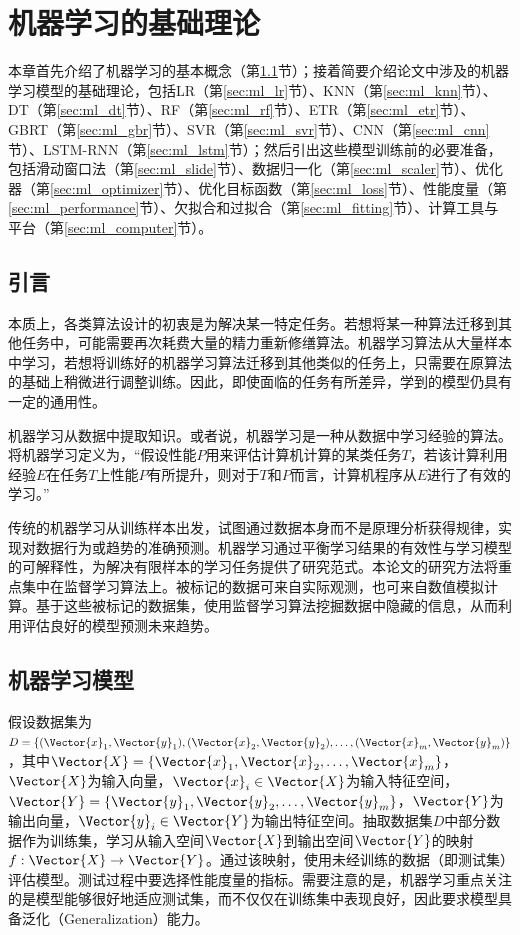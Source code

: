 \chapter{机器学习的基础理论}\label{chap:ml_theory}

本章首先介绍了机器学习的基本概念（第\ref{sec:ml_intro}节）；接着简要介绍论文中涉及的机器学习模型的基础理论，包括LR（第\ref{sec:ml_lr}节）、KNN（第\ref{sec:ml_knn}节）、DT（第\ref{sec:ml_dt}节）、RF（第\ref{sec:ml_rf}节）、ETR（第\ref{sec:ml_etr}节）、GBRT（第\ref{sec:ml_gbr}节）、SVR（第\ref{sec:ml_svr}节）、CNN（第\ref{sec:ml_cnn}节）、LSTM-RNN（第\ref{sec:ml_lstm}节）；然后引出这些模型训练前的必要准备，包括滑动窗口法（第\ref{sec:ml_slide}节）、数据归一化（第\ref{sec:ml_scaler}节）、优化器（第\ref{sec:ml_optimizer}节）、优化目标函数（第\ref{sec:ml_loss}节）、性能度量（第\ref{sec:ml_performance}节）、欠拟合和过拟合（第\ref{sec:ml_fitting}节）、计算工具与平台（第\ref{sec:ml_computer}节）。

\section{引言}\label{sec:ml_intro}

本质上，各类算法设计的初衷是为解决某一特定任务。若想将某一种算法迁移到其他任务中，可能需要再次耗费大量的精力重新修缮算法。机器学习算法从大量样本中学习，若想将训练好的机器学习算法迁移到其他类似的任务上，只需要在原算法的基础上稍微进行调整训练。因此，即使面临的任务有所差异，学到的模型仍具有一定的通用性\citep{Goodfellow2016Deep}。

机器学习从数据中提取知识。或者说，机器学习是一种从数据中学习经验的算法。\citet{Mitchell1997Machine}将机器学习定义为，“假设性能$P$用来评估计算机计算的某类任务$T$，若该计算利用经验$E$在任务$T$上性能$P$有所提升，则对于$T$和$P$而言，计算机程序从$E$进行了有效的学习。”

传统的机器学习从训练样本出发，试图通过数据本身而不是原理分析获得规律，实现对数据行为或趋势的准确预测。机器学习通过平衡学习结果的有效性与学习模型的可解释性，为解决有限样本的学习任务提供了研究范式。本论文的研究方法将重点集中在监督学习算法上。被标记的数据可来自实际观测，也可来自数值模拟计算。基于这些被标记的数据集，使用监督学习算法挖掘数据中隐藏的信息，从而利用评估良好的模型预测未来趋势。

\section{机器学习模型}\label{sec:ml}

假设数据集为$D=\{(\Vector{x}_1,\Vector{y}_1),(\Vector{x}_2,\Vector{y}_2),\ldots,(\Vector{x}_m,\Vector{y}_m)\}$，其中$\Vector{X}=\{\Vector{x}_1,\Vector{x}_2,\ldots,\Vector{x}_m\}$，$\Vector{X}$为输入向量，$\Vector{x}_i\in\Vector{X}$为输入特征空间，$\Vector{Y}=\{\Vector{y}_1,\Vector{y}_2,\ldots,\Vector{y}_m\}$，$\Vector{Y}$为输出向量，$\Vector{y}_i\in\Vector{Y}$为输出特征空间。抽取数据集$D$中部分数据作为训练集，学习从输入空间$\Vector{X}$到输出空间$\Vector{Y}$的映射$f:\Vector{X}\rightarrow\Vector{Y}$。通过该映射，使用未经训练的数据（即测试集）评估模型。测试过程中要选择性能度量的指标。需要注意的是，机器学习重点关注的是模型能够很好地适应测试集，而不仅仅在训练集中表现良好，因此要求模型具备泛化（Generalization）能力。

